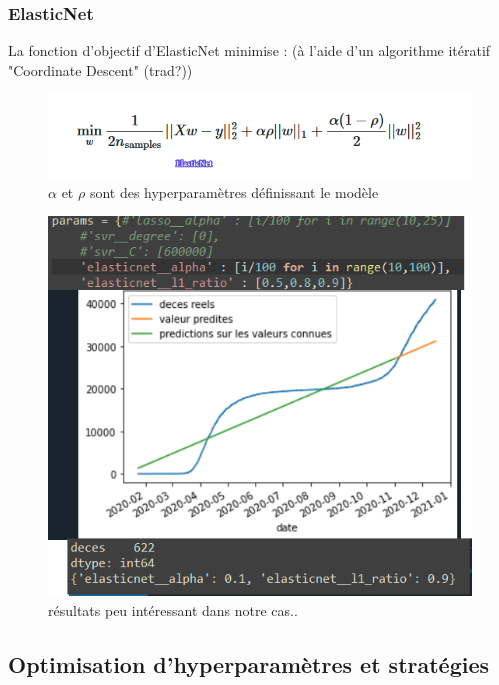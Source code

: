 \documentclass{beamer}
\begin{document}
\begin{frame}
	\frametitle{ElasticNet}
	La fonction d'objectif d'ElasticNet minimise : (à l'aide d'un algorithme itératif "Coordinate Descent" (trad?))
	\begin{figure}[h]
		\centering
		\includegraphics[scale=0.4]{fonction_dobj}
		\caption{$\alpha$ et $\rho$ sont des hyperparamètres définissant le modèle}
	\end{figure}
	\begin{figure}[b]
		\includegraphics[scale=0.2]{EN}
		\centering
		\caption{résultats peu intéressant dans notre cas..}
	\end{figure}
\end{frame}

\subsection{Optimisation d'hyperparamètres et stratégies}
\end{document}
